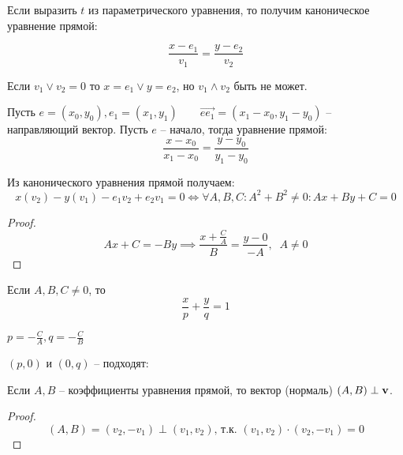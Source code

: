 \begin{definition}
    Если выразить $t$ из параметрического уравнения, то получим каноническое уравнение прямой:

    \[\frac{x - e_1}{v_1} = \frac{y - e_2}{v_2}\]

    Если $v_1 \lor v_2 = 0$ то $x = e_1 \lor y = e_2$, но $v_1 \land v_2$ быть не может.
\end{definition}

\begin{definition}
    Пусть $e = (x_0, y_0), e_1 = (x_1, y_1) \qquad \vec{ee_1} = (x_1 - x_0, y_1 - y_0)$ 
    -- направляющий вектор. Пусть $e$ -- начало, тогда уравнение прямой:
    \[\frac{x - x_0}{x_1-x_0} = \frac{y-y_0}{y_1-y_0}\]
\end{definition}

\begin{theorem}
    
    Из канонического уравнения прямой получаем:
    \[x(v_2) - y(v_1) - e_1v_2 + e_2v_1 = 0 \Leftrightarrow \forall A, B, C: A^2 + B^2 \neq 0: Ax + By + C = 0\]
\end{theorem}

\begin{proof}
    \[
        Ax + C = -By \implies
        \frac{x + \frac{C}{A}}{B} = \frac{y - 0}{-A}, \;\; A \neq 0
    \]
\end{proof}

\begin{definition}
    Если $A,B,C \neq 0$, то
    \[\frac{x}{p} + \frac{y}{q}=1\]

    $p = -\frac{C}{A}, q = -\frac{C}{B}$
\end{definition}
$(p,0)$ и $(0,q)$ -- подходят:
\begin{center}
\end{center}

\begin{theorem}
    Если $A, B$ -- коэффициенты уравнения прямой, то вектор (нормаль) $(A, B) \perp \mathbf{v}$.
\end{theorem}

\begin{proof}
    \[(A, B) = (v_2, -v_1) \perp (v_1, v_2) \text{, т.к. } (v_1, v_2) \cdot (v_2, -v_1) = 0\]
\end{proof}